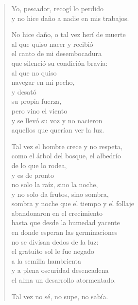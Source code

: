 \documentclass[12pt]{article}
\begin{document}
\begin{verse}
Yo, pescador, recogí lo perdido\\
y no hice daño a nadie en mis trabajos.  

No hice daño, o tal vez herí de muerte\\
al que quiso nacer y recibió\\
el canto de mi desembocadura\\
que silenció su condición bravía:\\
al que no quiso\\
navegar en mi pecho,\\
y desató\\
su propia fuerza,\\
pero vino el viento\\
y se llevó su voz y no nacieron\\
aquellos que querían ver la luz.  

Tal vez el hombre crece y no respeta,\\
como el árbol del bosque, el albedrío\\
de lo que lo rodea,\\
y es de pronto\\
no solo la raíz, sino la noche,\\
y no solo da frutos, sino sombra,\\
sombra y noche que el tiempo y el follaje\\
abandonaron en el crecimiento\\
hasta que desde la humedad yacente\\
en donde esperan las germinaciones\\
no se divisan dedos de la luz:\\
el gratuito sol le fue negado\\
a la semilla hambrienta\\
y a plena oscuridad desencadena\\
el alma un desarrollo atormentado.  

Tal vez no sé, no supe, no sabía.  


\end{verse}
\end{document}
